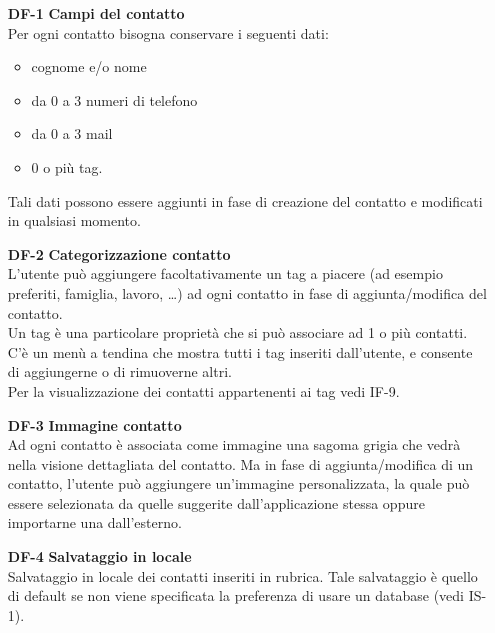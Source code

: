 \begin{tcolorbox}[colback=white,colframe=black!80!white,title=\textbf{Esigenze dei dati e informazioni DF}]
	\begin{itemize}[itemsep=2pt, topsep=0pt]
		\item[\textbf{DF-1}] \textbf{Campi del contatto}
		\\Per ogni contatto bisogna conservare i seguenti dati:
		\begin{itemize}[noitemsep, topsep=0pt, label=$\bullet$]
			\item cognome e/o nome
			\item da 0 a 3 numeri di telefono
			\item da 0 a 3 mail 
			\item 0 o più tag.
		\end{itemize}
		Tali dati possono essere aggiunti in fase di creazione del contatto e modificati in qualsiasi momento.
		
		\item[\textbf{DF-2}] \textbf{Categorizzazione contatto}
		\\L’utente può aggiungere facoltativamente un tag a piacere (ad esempio preferiti, famiglia, lavoro, …) ad ogni contatto in fase di aggiunta/modifica del contatto.
		\\Un tag è una particolare proprietà che si può associare ad 1 o più contatti.
		C’è un menù a tendina che mostra tutti i tag inseriti dall’utente, e consente di aggiungerne o di rimuoverne altri. 
		\\Per la visualizzazione dei contatti appartenenti ai tag vedi IF-9.
		
		\item[\textbf{DF-3}] \textbf{Immagine contatto}
		\\Ad ogni contatto è associata come immagine una sagoma grigia che vedrà nella visione dettagliata del contatto. Ma in fase di aggiunta/modifica di un contatto, l’utente può aggiungere un’immagine personalizzata, la quale può essere selezionata da quelle suggerite dall’applicazione stessa oppure importarne una dall’esterno.
		
		\item[\textbf{DF-4}] \textbf{Salvataggio in locale}
		\\Salvataggio in locale dei contatti inseriti in rubrica. Tale salvataggio è quello di default se non viene specificata la preferenza di usare un database (vedi IS-1).
		
	\end{itemize}
\end{tcolorbox}

